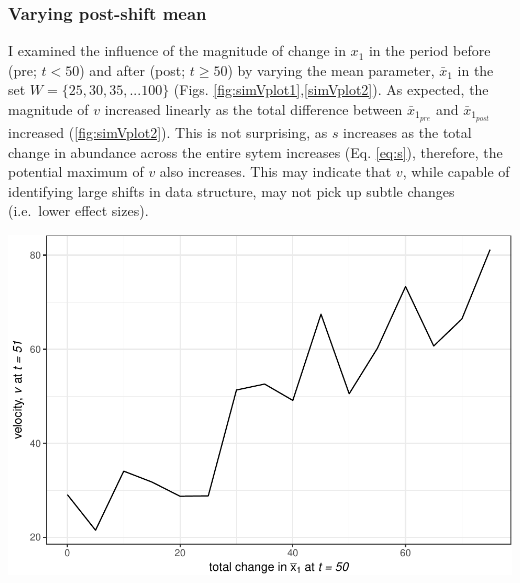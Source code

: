 \documentclass[12pt,twoside,openany]{reedthesis}
\newenvironment{Shaded}{\begin{snugshade}}{\end{snugshade}}
\newcommand{\KeywordTok}[1]{\textcolor[rgb]{0.13,0.29,0.53}{\textbf{#1}}}
\newcommand{\DataTypeTok}[1]{\textcolor[rgb]{0.13,0.29,0.53}{#1}}
\newcommand{\DecValTok}[1]{\textcolor[rgb]{0.00,0.00,0.81}{#1}}
\newcommand{\StringTok}[1]{\textcolor[rgb]{0.31,0.60,0.02}{#1}}
\newcommand{\OperatorTok}[1]{\textcolor[rgb]{0.81,0.36,0.00}{\textbf{#1}}}
\newcommand{\NormalTok}[1]{#1}
\begin{document}
\subsubsection{Varying post-shift mean}\label{varying-post-shift-mean}

I examined the influence of the magnitude of change in \(x_1\) in the
period before (pre; \(t <50\)) and after (post; \(t \geq 50\)) by
varying the mean parameter, \(\bar{x}_1\) in the set
\(W=\{25,30,35,...100 \}\) (Figs. \ref{fig:simVplot1},\ref{simVplot2}).
As expected, the magnitude of \(v\) increased linearly as the total
difference between \(\bar{x}_{1_{pre}}\) and \(\bar{x}_{1_{post}}\)
increased (\ref{fig:simVplot2}). This is not surprising, as \(s\)
increases as the total change in abundance across the entire sytem
increases (Eq. \eqref{eq:s}), therefore, the potential maximum of \(v\)
also increases. This may indicate that \(v\), while capable of
identifying large shifts in data structure, may not pick up subtle
changes (i.e.~lower effect sizes).
\begin{Shaded}
\end{Shaded}
\includegraphics{_myDissertation_files/figure-latex/simVplot1-1.pdf}
\end{document}
